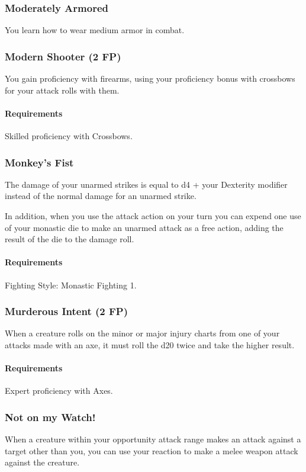 \subsubsection{Moderately Armored} \label{feat::moderatelyarmored}
    You learn how to wear medium armor in combat.
\subsubsection{Modern Shooter (2 FP)} \label{feat::modernshooter}
    You gain proficiency with firearms, using your proficiency bonus with crossbows for your attack rolls with them.
    \paragraph{Requirements} Skilled proficiency with Crossbows.
\subsubsection{Monkey's Fist} \label{feat::monkeysfist}
    The damage of your unarmed strikes is equal to d4 + your Dexterity modifier instead of the normal damage for an unarmed strike.

    In addition, when you use the attack action on your turn you can expend one use of your monastic die to make an unarmed attack as a free action, adding the result of the die to the damage roll.
    \paragraph{Requirements} Fighting Style: Monastic Fighting 1.
\subsubsection{Murderous Intent (2 FP)} \label{feat::murderousintent}
    When a creature rolls on the minor or major injury charts from one of your attacks made with an axe, it must roll the d20 twice and take the higher result.
    \paragraph{Requirements} Expert proficiency with Axes.
\subsubsection{Not on my Watch!} \label{feat::notonmywatch}
    When a creature within your opportunity attack range makes an attack against a target other than you, you can use your reaction to make a melee weapon attack against the creature.
